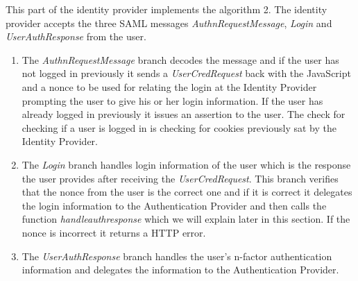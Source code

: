 \documentclass[twosided]{report}
\begin{document}
This part of the identity provider implements the algorithm 2. The identity provider accepts the three SAML messages \emph{AuthnRequestMessage}, \emph{Login} and \emph{UserAuthResponse} from the user.
\begin{enumerate}
\item The \emph{AuthnRequestMessage} branch decodes the message and if the user has not logged in previously it sends a \emph{UserCredRequest} back with the JavaScript and a nonce to be used for relating the login at the Identity Provider prompting the user to give his or her login information. If the user has already logged in previously it issues an assertion to the user. The check for checking if a user is logged in is checking for cookies previously sat by the Identity Provider.
\item The \emph{Login} branch handles login information of the user which is the response the user provides after receiving the \emph{UserCredRequest}. This branch verifies that the nonce from the user is the correct one and if it is correct it delegates the login information to the Authentication Provider and then calls the function \emph{handleauthresponse} which we will explain later in this section. If the nonce is incorrect it returns a HTTP error.
\item The \emph{UserAuthResponse} branch handles the user's n-factor authentication information and delegates the information to the Authentication Provider.
\end{enumerate}
\end{document}
